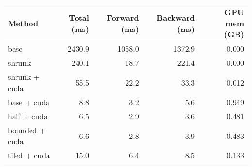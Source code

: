 \begin{tabular}{lrrrr}
\hline
 Method         &   Total (ms) &   Forward (ms) &   Backward (ms) &   GPU mem (GB) \\
\hline
 base           &       2430.9 &         1058.0 &          1372.9 &          0.000 \\
 shrunk         &        240.1 &           18.7 &           221.4 &          0.000 \\
 shrunk + cuda  &         55.5 &           22.2 &            33.3 &          0.012 \\
 base + cuda    &          8.8 &            3.2 &             5.6 &          0.949 \\
 half + cuda    &          6.5 &            2.9 &             3.6 &          0.481 \\
 bounded + cuda &          6.6 &            2.8 &             3.9 &          0.483 \\
 tiled + cuda   &         15.0 &            6.4 &             8.5 &          0.133 \\
\hline
\end{tabular}
